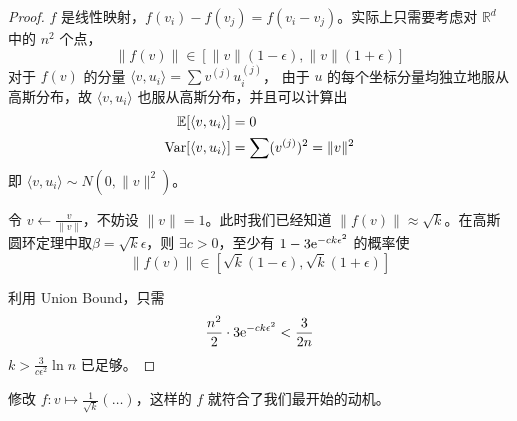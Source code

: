 \begin{proof}
    $f$ 是线性映射，$f(v_{i})-f(v_{j})=f(v_{i}-v_{j})$。实际上只需要考虑对 $\mathbb{R}^{d}$ 中的 $n^{2}$ 个点，
    \[
    	\|f(v)\| \in [\|v\|(1-\epsilon), \|v\|(1+\epsilon)]
    \]
    对于 $f(v)$ 的分量 $\langle v, u_{i} \rangle = \sum v^{(j)}u_{i}^{(j)}$，
    由于 $u$ 的每个坐标分量均独立地服从高斯分布，故 $\langle v, u_{i} \rangle$ 也服从高斯分布，并且可以计算出
    \begin{align*}
    	\mathbb{E}[\langle v, u_{i} \rangle] &= 0 \\
    	\text{Var}[\langle v, u_{i} \rangle] &= \sum (v^{(j)})^{2}=\|v\|^{2}
    \end{align*}
    即 $\langle v, u_{i} \rangle \sim N(0,\|v\|^{2})$。
    
    令 $v \leftarrow \frac{v}{\|v\|}$，不妨设 $\|v\|=1$。此时我们已经知道 $\|f(v)\| \approx \sqrt{k}$。在高斯圆环定理中取$\beta=\sqrt{k}\epsilon$，则 $\exists c>0$，至少有 $1-3\mathrm{e}^{-ck\epsilon^{2}}$ 的概率使
    \[
    	\|f(v)\| \in [\sqrt{k}(1-\epsilon), \sqrt{k}(1+\epsilon)]
    \]
    
    利用 Union Bound，只需
    \[
    	\frac{n^2}{2} \cdot 3\mathrm{e}^{-ck\epsilon^{2}} < \frac{3}{2n}
    \]
    $k > \frac{3}{c\epsilon^{2}}\ln n$ 已足够。
\end{proof}

修改 $f: v \mapsto \frac{1}{\sqrt{k}}(\dots)$，这样的 $f$ 就符合了我们最开始的动机。
